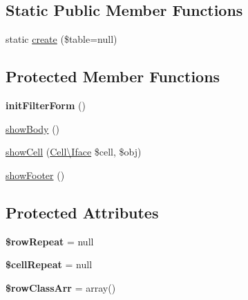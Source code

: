 \subsection*{Static Public Member Functions}
\begin{DoxyCompactItemize}
\item 
static \hyperlink{classTk_1_1Table_1_1Renderer_1_1Dom_1_1Table_a117cf791107139e348c89844903cbc30}{create} (\$table=null)
\end{DoxyCompactItemize}
\subsection*{Protected Member Functions}
\begin{DoxyCompactItemize}
\item 
\hypertarget{classTk_1_1Table_1_1Renderer_1_1Dom_1_1Table_aa49ad9a2215efc7eba006c4e710b4874}{{\bfseries init\+Filter\+Form} ()}\label{classTk_1_1Table_1_1Renderer_1_1Dom_1_1Table_aa49ad9a2215efc7eba006c4e710b4874}

\item 
\hyperlink{classTk_1_1Table_1_1Renderer_1_1Dom_1_1Table_a841760ab8e33de7f4a119b943d417407}{show\+Body} ()
\item 
\hyperlink{classTk_1_1Table_1_1Renderer_1_1Dom_1_1Table_a77a1d1847b52e45dd8ad35fe948e4742}{show\+Cell} (\hyperlink{classTk_1_1Table_1_1Cell_1_1Iface}{Cell\textbackslash{}\+Iface} \$cell, \$obj)
\item 
\hyperlink{classTk_1_1Table_1_1Renderer_1_1Dom_1_1Table_a3d51113445ede53a8dc547120f281435}{show\+Footer} ()
\end{DoxyCompactItemize}
\subsection*{Protected Attributes}
\begin{DoxyCompactItemize}
\item 
\hypertarget{classTk_1_1Table_1_1Renderer_1_1Dom_1_1Table_a3448512dadb76987c5b4993b24ad896f}{{\bfseries \$row\+Repeat} = null}\label{classTk_1_1Table_1_1Renderer_1_1Dom_1_1Table_a3448512dadb76987c5b4993b24ad896f}

\item 
\hypertarget{classTk_1_1Table_1_1Renderer_1_1Dom_1_1Table_a155944715bc150a01f29f580c2bb556a}{{\bfseries \$cell\+Repeat} = null}\label{classTk_1_1Table_1_1Renderer_1_1Dom_1_1Table_a155944715bc150a01f29f580c2bb556a}

\item 
\hypertarget{classTk_1_1Table_1_1Renderer_1_1Dom_1_1Table_a5e0ffac99c63badeb15b7e891794d66a}{{\bfseries \$row\+Class\+Arr} = array()}\label{classTk_1_1Table_1_1Renderer_1_1Dom_1_1Table_a5e0ffac99c63badeb15b7e891794d66a}

\end{DoxyCompactItemize}


